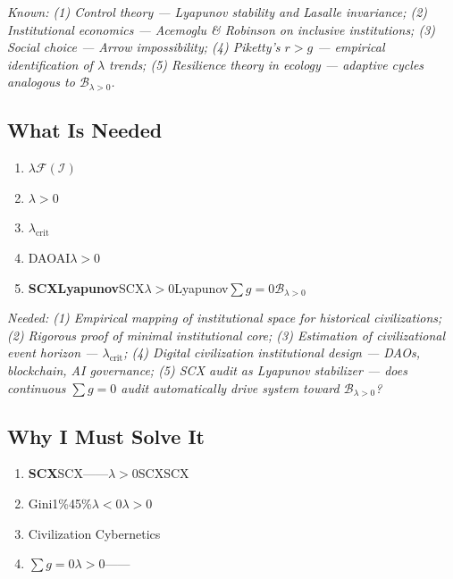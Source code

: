 \documentclass[12pt,a4paper]{article}
\theoremstyle{remark}
\newcommand{\F}{\mathcal{F}}
\newcommand{\B}{\mathcal{B}}
\begin{document}
\medskip
\noindent\textit{Known: (1) Control theory — Lyapunov stability and Lasalle invariance; (2) Institutional economics — Acemoglu \& Robinson on inclusive institutions; (3) Social choice — Arrow impossibility; (4) Piketty's $r > g$ — empirical identification of $\lambda$ trends; (5) Resilience theory in ecology — adaptive cycles analogous to $\B_{\lambda>0}$.}

\subsection{ What Is Needed}

\begin{enumerate}[label=(\arabic*)]
    \item \textbf{}$\lambda$$\F(\mathcal{I})$
    
    \item \textbf{}$\lambda > 0$
    
    \item \textbf{}$\lambda_{\text{crit}}$
    
    \item \textbf{}DAOAI$\lambda > 0$
    
    \item \textbf{SCXLyapunov}SCX$\lambda > 0$Lyapunov$\sum g = 0$$\B_{\lambda>0}$
\end{enumerate}

\medskip
\noindent\textit{Needed: (1) Empirical mapping of institutional space for historical civilizations; (2) Rigorous proof of minimal institutional core; (3) Estimation of civilizational event horizon — $\lambda_{\text{crit}}$; (4) Digital civilization institutional design — DAOs, blockchain, AI governance; (5) SCX audit as Lyapunov stabilizer — does continuous $\sum g = 0$ audit automatically drive system toward $\B_{\lambda>0}$?}

\subsection{ Why I Must Solve It}

\begin{enumerate}[label=(\arabic*)]
    \item \textbf{SCX}SCX——$\lambda > 0$SCXSCX
    
    \item \textbf{}Gini1\%45\%$\lambda < 0$$\lambda > 0$
    
    \item \textbf{}\"\"\textbf{}Civilization Cybernetics
    
    \item \textbf{}$\sum g = 0$$\lambda > 0$——
\end{enumerate}
\end{document}
